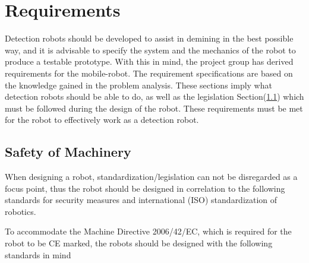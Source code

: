 \chapter{Requirements}

Detection robots should be developed to assist in demining in the best possible way, and it is advisable to specify the system and the mechanics of the robot to produce a testable prototype. With this in mind, the project group has derived requirements for the mobile-robot. The requirement specifications are based on the knowledge gained in the problem analysis. These sections imply what detection robots should be able to do, as well as the legislation Section(\ref{safety_of_machinery}) which must be followed during the design of the robot. These requirements must be met for the robot to effectively work as a detection robot.

\vspace{4mm}

\section{Safety of Machinery}\label{safety_of_machinery}
When designing a robot, standardization/legislation can not be disregarded as a focus point, thus the robot should be designed in correlation to the following standards for security measures and international (ISO) standardization of robotics.

\vspace{1mm}

To accommodate the Machine Directive 2006/42/EC, which is required for the robot to be CE marked, the robots should be designed with the following standards in mind

